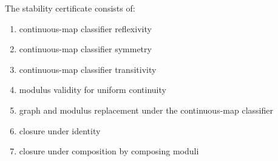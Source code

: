 \begin{definition}
\label{def:continuous-stability-certificate}
The stability certificate consists of:
\begin{enumerate}
  \item continuous-map classifier reflexivity
  \item continuous-map classifier symmetry
  \item continuous-map classifier transitivity
  \item modulus validity for uniform continuity
  \item graph and modulus replacement under the continuous-map classifier
  \item closure under identity
  \item closure under composition by composing moduli
\end{enumerate}
\end{definition}
